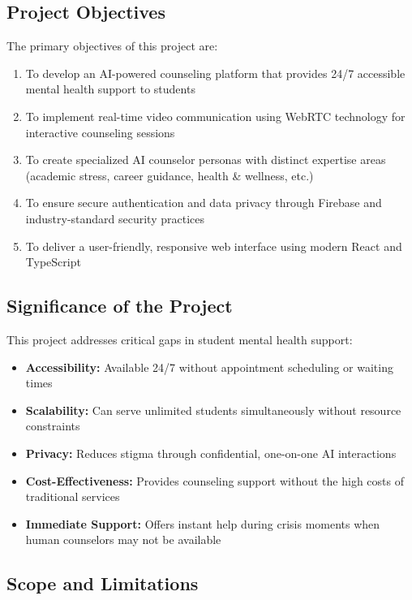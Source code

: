 \documentclass[11pt,a4paper]{article}
\begin{document}
\subsection{Project Objectives}
The primary objectives of this project are:

\begin{enumerate}
    \item To develop an AI-powered counseling platform that provides 24/7 accessible mental health support to students
    \item To implement real-time video communication using WebRTC technology for interactive counseling sessions
    \item To create specialized AI counselor personas with distinct expertise areas (academic stress, career guidance, health \& wellness, etc.)
    \item To ensure secure authentication and data privacy through Firebase and industry-standard security practices
    \item To deliver a user-friendly, responsive web interface using modern React and TypeScript
\end{enumerate}

\subsection{Significance of the Project}
This project addresses critical gaps in student mental health support:

\begin{itemize}
    \item \textbf{Accessibility:} Available 24/7 without appointment scheduling or waiting times
    \item \textbf{Scalability:} Can serve unlimited students simultaneously without resource constraints
    \item \textbf{Privacy:} Reduces stigma through confidential, one-on-one AI interactions
    \item \textbf{Cost-Effectiveness:} Provides counseling support without the high costs of traditional services
    \item \textbf{Immediate Support:} Offers instant help during crisis moments when human counselors may not be available
\end{itemize}

\subsection{Scope and Limitations}
\end{document}
